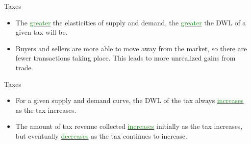 \documentclass[xcolor={dvipsnames},pdf, hyperref={colorlinks=true, citecolor=ForestGreen, linkcolor=BlueViolet, urlcolor=Magenta}]{beamer}
\newcommand{\dd}[1]{{\underline{\textcolor{ForestGreen}{#1}}}}
\begin{document}
\begin{frame}{Taxes}
	\begin{itemize}
		\item The \dd{greater} the elasticities of supply and demand, the \dd{greater} the DWL of a given tax will be.
		\item Buyers and sellers are more able to move away from the market, so there are fewer transactions taking place. This leads to more unrealized gains from trade.
	\end{itemize}
\end{frame}

\begin{frame}{Taxes}
	\begin{itemize}
		\item 	For a given supply and demand curve, the DWL of the tax always \dd{increases} as the tax increases.
		\item The amount of tax revenue collected \dd{increases} initially as the tax increases, but eventually \dd{decreases} as the tax continues to increase.
	\end{itemize}
	

	
\end{frame}
\end{document}
